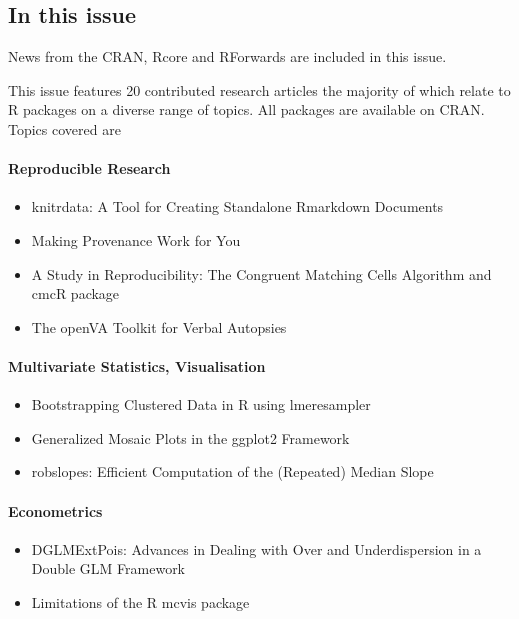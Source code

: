 \hypertarget{in-this-issue}{%
\subsection{In this issue}\label{in-this-issue}}

News from the CRAN, Rcore and RForwards are included in this issue.

\noindent This issue features 20 contributed research articles the majority of which relate to R packages
on a diverse range of topics. All packages are available on CRAN. Topics covered are

\hypertarget{reproducible-research}{%
\paragraph{Reproducible Research}\label{reproducible-research}}

\begin{itemize}
\tightlist
\item
  knitrdata: A Tool for Creating Standalone Rmarkdown Documents
\item
  Making Provenance Work for You
\item
  A Study in Reproducibility: The Congruent Matching Cells Algorithm and cmcR package
\item
  The openVA Toolkit for Verbal Autopsies
\end{itemize}

\hypertarget{multivariate-statistics-visualisation}{%
\paragraph{Multivariate Statistics, Visualisation}\label{multivariate-statistics-visualisation}}

\begin{itemize}
\tightlist
\item
  Bootstrapping Clustered Data in R using lmeresampler
\item
  Generalized Mosaic Plots in the ggplot2 Framework
\item
  robslopes: Efficient Computation of the (Repeated) Median Slope
\end{itemize}

\hypertarget{econometrics}{%
\paragraph{Econometrics}\label{econometrics}}

\begin{itemize}
\tightlist
\item
  DGLMExtPois: Advances in Dealing with Over and Underdispersion in a Double GLM Framework
\item
  Limitations of the R mcvis package
\end{itemize}


